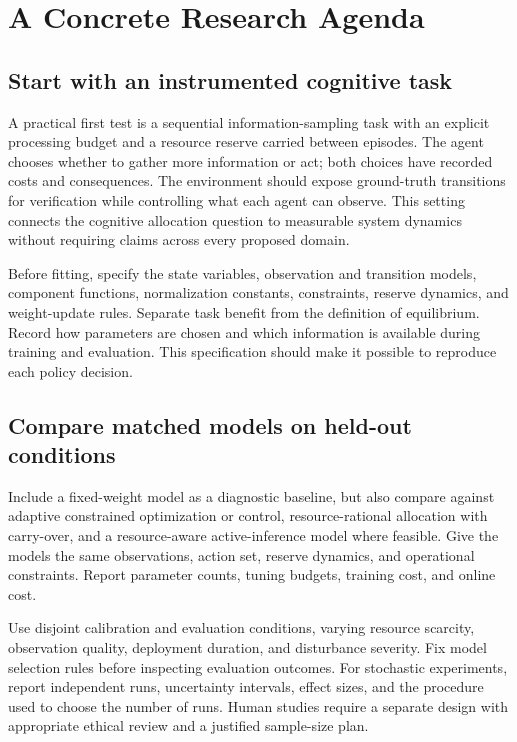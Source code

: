 \section{A Concrete Research Agenda}
\label{sec:future}

\subsection{Start with an instrumented cognitive task}
A practical first test is a sequential information-sampling task with an explicit processing budget and a resource reserve carried between episodes. The agent chooses whether to gather more information or act; both choices have recorded costs and consequences. The environment should expose ground-truth transitions for verification while controlling what each agent can observe. This setting connects the cognitive allocation question to measurable system dynamics without requiring claims across every proposed domain.

Before fitting, specify the state variables, observation and transition models, component functions, normalization constants, constraints, reserve dynamics, and weight-update rules. Separate task benefit from the definition of equilibrium. Record how parameters are chosen and which information is available during training and evaluation. This specification should make it possible to reproduce each policy decision.

\subsection{Compare matched models on held-out conditions}
Include a fixed-weight model as a diagnostic baseline, but also compare against adaptive constrained optimization or control, resource-rational allocation with carry-over, and a resource-aware active-inference model where feasible. Give the models the same observations, action set, reserve dynamics, and operational constraints. Report parameter counts, tuning budgets, training cost, and online cost.

Use disjoint calibration and evaluation conditions, varying resource scarcity, observation quality, deployment duration, and disturbance severity. Fix model selection rules before inspecting evaluation outcomes. For stochastic experiments, report independent runs, uncertainty intervals, effect sizes, and the procedure used to choose the number of runs. Human studies require a separate design with appropriate ethical review and a justified sample-size plan.

